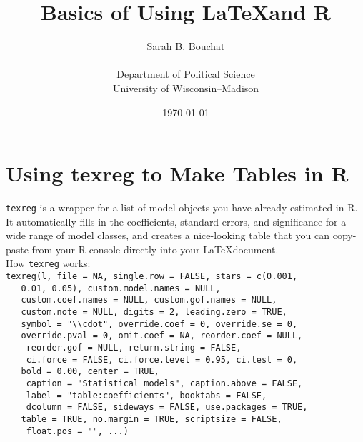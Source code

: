 \documentclass[11pt]{article}
\title{Basics of Using \LaTeX and \textsf{R}}
\author{Sarah B. Bouchat \\\\ Department of Political Science \\ University of Wisconsin--Madison}
\date{\today}
\begin{document}
\maketitle

\section*{Using texreg to Make Tables in \textsf{R}}
\noindent \verb+texreg+ is a wrapper for a list of model objects you have already estimated in \textsf{R}. It automatically fills in the coefficients, standard errors, and significance for a wide range of model classes, and creates a nice-looking table that you can copy-paste from your \textsf{R} console directly into your \LaTeX document.\\

\noindent How \verb+texreg+ works:\\
\vspace{10pt}
\verb+texreg(l, file = NA, single.row = FALSE, stars = c(0.001, +\\

 \verb+   0.01, 0.05), custom.model.names = NULL, +\\
 \verb+   custom.coef.names = NULL, custom.gof.names = NULL, +\\
 \verb+   custom.note = NULL, digits = 2, leading.zero = TRUE, +\\
 \verb+   symbol = "\\cdot", override.coef = 0, override.se = 0, +\\
 \verb+   override.pval = 0, omit.coef = NA, reorder.coef = NULL, +\\
\verb+    reorder.gof = NULL, return.string = FALSE, +\\
\verb+    ci.force = FALSE, ci.force.level = 0.95, ci.test = 0, +\\
 \verb+   bold = 0.00, center = TRUE, +\\
\verb+    caption = "Statistical models", caption.above = FALSE, +\\
\verb+    label = "table:coefficients", booktabs = FALSE, +\\
\verb+    dcolumn = FALSE, sideways = FALSE, use.packages = TRUE, +\\
 \verb+   table = TRUE, no.margin = TRUE, scriptsize = FALSE, +\\
\verb+    float.pos = "", ...)+

\newpage
\end{document}
